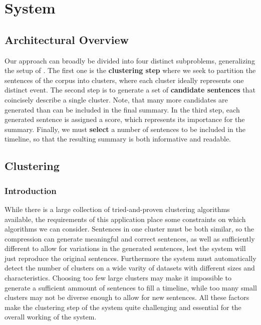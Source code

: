 \documentclass[a4paper,BCOR=10mm]{report}
\begin{document}

\chapter{System}

\section{Architectural Overview}

Our approach can broadly be divided into four distinct subproblems, generalizing the setup of \citet{banerjee}.
The first one is the \textbf{clustering step} where we seek to partition the sentences of the corpus into clusters, where each cluster ideally represents one distinct event.
The second step is to generate a set of \textbf{candidate sentences} that coincisely describe a single cluster. Note, that many more candidates are generated than can be included in the final summary.
In the third step, each generated sentence is assigned a score, which represents its importance for the summary.
Finally, we must \textbf{select} a number of sentences to be included in the timeline, so that the resulting summary is both informative and readable.

\section{Clustering}

\subsection{Introduction}

While there is a large collection of tried-and-proven clustering algorithms available, the requirements of this application place some constraints on which algorithms we can consider. Sentences in one cluster must be both similar, so the compression can generate meaningful and correct sentences, as well as sufficiently different to allow for variations in the generated sentences, lest the system will just reproduce the original sentences.
Furthermore the system must automatically detect the number of clusters on a wide varity of datasets with different sizes and characteristics.
Choosing too few large clusters may make it impossible to generate a sufficient ammount of sentences to fill a timeline, while too many small clusters may not be diverse enough to allow for new sentences.
All these factors make the clustering step of the system quite challenging and essential for the overall working of the system.
\end{document}
